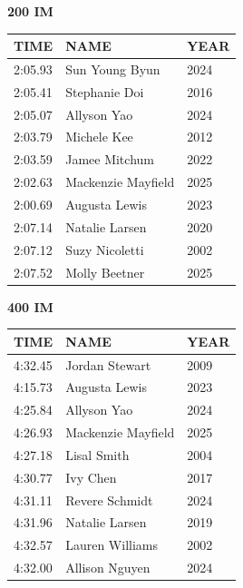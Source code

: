 \begin{table}[H]
\centering
\begin{minipage}[t]{0.48\textwidth}
\centering
\textbf{200 IM}\\[0.1cm]
\begin{tabular}{@{}p{1.8cm}p{2.8cm}p{1.2cm}@{}}
\hline
    \textbf{TIME} & \textbf{NAME} & \textbf{YEAR} \\
\hline
    2:05.93 & Sun Young Byun & 2024 \\
    2:05.41 & Stephanie Doi & 2016 \\
    2:05.07 & Allyson Yao & 2024 \\
    2:03.79 & Michele Kee & 2012 \\
    2:03.59 & Jamee Mitchum & 2022 \\
    2:02.63 & Mackenzie Mayfield & 2025 \\
    2:00.69 & Augusta Lewis & 2023 \\
    2:07.14 & Natalie Larsen & 2020 \\
    2:07.12 & Suzy Nicoletti & 2002 \\
    2:07.52 & Molly Beetner & 2025 \\
\hline
\end{tabular}
\end{minipage}\hfill
\begin{minipage}[t]{0.48\textwidth}
\centering
\textbf{400 IM}\\[0.1cm]
\begin{tabular}{@{}p{1.8cm}p{2.8cm}p{1.2cm}@{}}
\hline
    \textbf{TIME} & \textbf{NAME} & \textbf{YEAR} \\
\hline
    4:32.45 & Jordan Stewart & 2009 \\
    4:15.73 & Augusta Lewis & 2023 \\
    4:25.84 & Allyson Yao & 2024 \\
    4:26.93 & Mackenzie Mayfield & 2025 \\
    4:27.18 & Lisal Smith & 2004 \\
    4:30.77 & Ivy Chen & 2017 \\
    4:31.11 & Revere Schmidt & 2024 \\
    4:31.96 & Natalie Larsen & 2019 \\
    4:32.57 & Lauren Williams & 2002 \\
    4:32.00 & Allison Nguyen & 2024 \\
\hline
\end{tabular}
\end{minipage}
\end{table}

